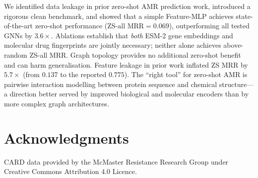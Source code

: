 \documentclass[conference]{IEEEtran}
\begin{document}
We identified data leakage in prior zero-shot AMR prediction work,
introduced a rigorous clean benchmark, and showed that a simple
Feature-MLP achieves state-of-the-art zero-shot performance
($\text{ZS-all MRR} = 0.069$), outperforming all tested GNNs by $3.6\times$.
Ablations establish that \emph{both} ESM-2 gene embeddings and molecular drug
fingerprints are jointly necessary; neither alone achieves above-random ZS-all
MRR. Graph topology provides no additional zero-shot benefit and can harm
generalisation. Feature leakage in prior work inflated ZS MRR by $5.7\times$
(from $0.137$ to the reported $0.775$). The ``right tool'' for zero-shot AMR
is pairwise interaction modelling between protein sequence and chemical
structure---a direction better served by improved biological and molecular
encoders than by more complex graph architectures.

\section*{Acknowledgments}
CARD data provided by the McMaster Resistance Research Group under
Creative Commons Attribution 4.0 Licence.



\end{document}
